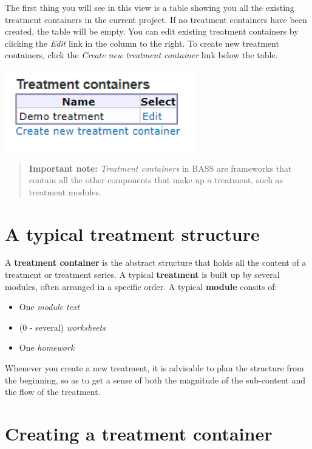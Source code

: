 \documentclass[]{book}
\providecommand{\tightlist}{%
  \setlength{\itemsep}{0pt}\setlength{\parskip}{0pt}}
\begin{document}
The first thing you will see in this view is a table showing you all the existing treatment containers in the current project. If no treatment containers have been created, the table will be empty.
You can edit existing treatment containers by clicking the \emph{Edit} link in the column to the right.
To create new treatment containers, click the \emph{Create new treatment container} link below the table.

\includegraphics{images/new-images/treatmentContainers.png}

\begin{quote}
\textbf{Important note:} \emph{Treatment containers} in BASS are frameworks that contain all the other components that make up a treatment, such as treatment modules.
\end{quote}

\hypertarget{a-typical-treatment-structure}{%
\section{A typical treatment structure}\label{a-typical-treatment-structure}}

A \textbf{treatment container} is the abstract structure that holds all the content of a treatment or treatment series. A typical \textbf{treatment} is built up by several modules, often arranged in a specific order. A typical \textbf{module} consits of:

\begin{itemize}
\tightlist
\item
  One \emph{module text}
\item
  (0 - several) \emph{worksheets}
\item
  One \emph{homework}
\end{itemize}

Whenever you create a new treatment, it is advisable to plan the structure from the beginning, so as to get a sense of both the magnitude of the sub-content and the flow of the treatment.

\hypertarget{creating-a-treatment-container}{%
\section{Creating a treatment container}\label{creating-a-treatment-container}}
\end{document}
